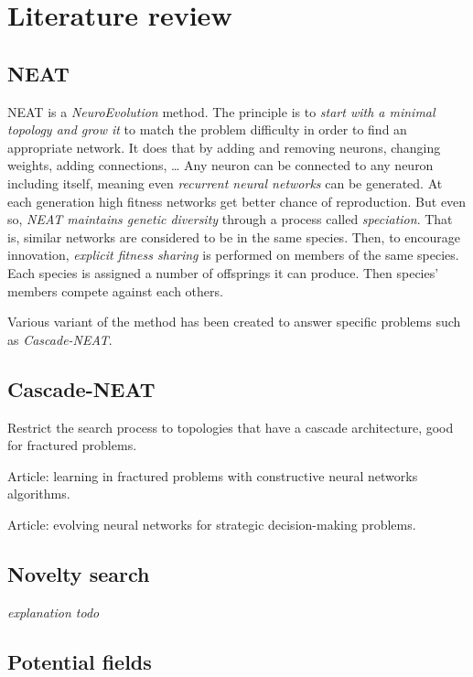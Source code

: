 \section{Literature review}\label{section:literature-review}

\subsection{NEAT}

NEAT is a \emph{NeuroEvolution} method. The principle is to \emph{start with a minimal topology and grow it} to match the problem difficulty in order to find an appropriate network.
It does that by adding and removing neurons, changing weights, adding connections, …
Any neuron can be connected to any neuron including itself, meaning even \emph{recurrent neural networks} can be generated.
At each generation high fitness networks get better chance of reproduction. But even so, \emph{NEAT maintains genetic diversity}
through a process called \emph{speciation}. That is, similar networks are considered to be in the same species. Then, to encourage innovation, \emph{explicit fitness sharing}
is performed on members of the same species. Each species is assigned a number of offsprings it can produce. Then species' members compete against each others. \cite{StMi02}

Various variant of the method has been created to answer specific problems such as \emph{Cascade-NEAT}.

\subsection{Cascade-NEAT}

Restrict the search process to topologies that have a cascade architecture, good for fractured problems.

Article: learning in fractured problems with constructive neural networks algorithms.

Article: evolving neural networks for strategic decision-making problems.

\subsection{Novelty search}

\emph{explanation todo} \cite{LeSt11}

\subsection{Potential fields}

